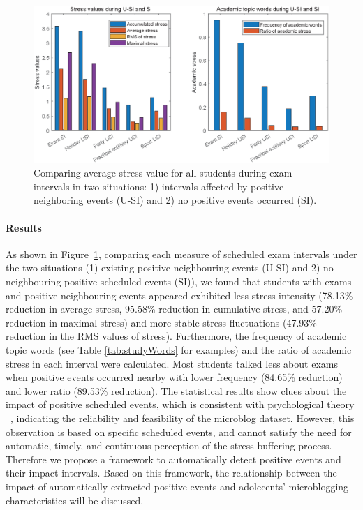 \begin{figure}[h]
\centering
\includegraphics[width=\linewidth]{figs/barUSI.eps}
\caption{\small{
Comparing average stress value for all students during exam intervals in two situations:
1) intervals affected by positive neighboring events (U-SI) and 2) no positive events occurred (SI).
}}
\label{fig:frequencyBar}
\end{figure}


\paragraph{Results}
As shown in Figure~\ref{fig:frequencyBar},
comparing each measure of scheduled exam intervals under the two situations
(1) existing positive neighbouring events (U-SI) and 2) no neighbouring positive scheduled events (SI)),
we found that students
with exams and positive neighbouring events appeared exhibited less stress intensity
(78.13\% reduction in average stress, 95.58\%  reduction in cumulative stress, and 57.20\%  reduction in maximal stress)
and more stable stress fluctuations (47.93\% reduction in the RMS values of stress).
Furthermore, the frequency of academic topic words (see Table \ref{tab:studyWords} for examples)
and the ratio of academic stress in each interval were calculated.
Most students talked less about exams when positive events occurred nearby with lower frequency (84.65\% reduction) and lower ratio (89.53\% reduction). 
The statistical results show clues about the impact of positive scheduled events,
which is consistent with psychological theory ~\citep{Cohen1984Positive, Cohen2010Positive, Needles1990Positive},
indicating the reliability and feasibility of the microblog dataset.
However,
this observation is based on specific scheduled events,
and cannot satisfy the need for automatic, timely, and continuous perception of the stress-buffering process.
Therefore we propose a framework to automatically detect positive events and their impact intervals.
Based on this framework,
the relationship between the impact of automatically extracted positive events
and adolecents' microblogging characteristics will be discussed. 

